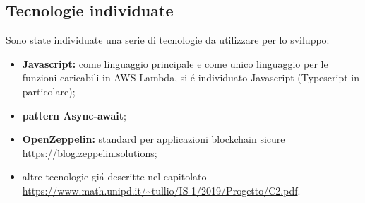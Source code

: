 \subsection{Tecnologie individuate}
Sono state individuate una serie di tecnologie da utilizzare per lo sviluppo:
\begin{itemize}
	\item \textbf{Javascript:} come linguaggio principale e come unico linguaggio per le funzioni caricabili in AWS Lambda, si é individuato Javascript (Typescript in particolare);
	\item \textbf{pattern Async-await};
	\item \textbf{OpenZeppelin:} standard per applicazioni blockchain sicure \url{https://blog.zeppelin.solutions};
	\item altre tecnologie giá descritte nel capitolato \url{https://www.math.unipd.it/~tullio/IS-1/2019/Progetto/C2.pdf}.
\end{itemize}
